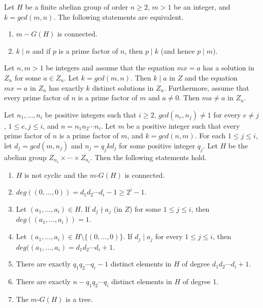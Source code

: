 \documentclass[10pt,a4paper]{amsart}
\begin{document}
\begin{thm}\label{T1}
	Let $H$ be a finite abelian group of order $n \geq 2$, $m > 1$ be an integer, and $k = gcd(m, n)$. The following statements are equivalent.
	\begin{enumerate}
		\item $m-G(H)$ is connected.
		\item $k\mid n$ and if $p$ is a prime factor of $n$, then $p \mid k$ (and hence $p \mid m$).
	\end{enumerate}
\end{thm}

\begin{lem}\label{L1}
	Let $n, m > 1$ be integers and assume that the equation $mx = a$ has a solution in $Z_n$ for some $a\in Z_n$. Let $k = gcd(m, n) $. Then $k \mid a$ in $Z$ and the equation $mx = a$ in $Z_n$ has exactly $k$ distinct solutions in $Z_n$.  Furthermore, assume that every prime factor of $n$ is a prime factor of $m$ and $a \not = 0$. Then $ma \not = a$ in $Z_n$.	
	\end{lem}

\begin{thm}\label{T5}
	Let $n_1, ..., n_i$  be positive integers such that $i \geq 2$,  $gcd(n_e, n_j) \not = 1$ for every $e \not = j$, $1 \leq e, j \leq i$, and $n = n_1n_2 \cdots n_i$. Let $m$ be a positive integer such that every prime factor of $n$ is a prime factor of $m$, and $k = gcd(n, m)$. For each $1 \leq j \leq i$, let $d_j = gcd(m, n_j)$ and $n_j = q_jkd_j$ for some positive integer $q_j$. Let $H$ be the abelian group $Z_{n_1}  \times \cdots \times Z_{n_i}$. Then the following statements hold.
	\begin{enumerate}
		\item  $H$ is not cyclic and the $m$-$G(H)$ is connected.
		\item $deg((0, ..., 0)) = d_1d_2\cdots d_i  - 1 \geq 2^i -1$.
		\item Let $(a_1, ..., a_i) \in H$. If $d_j \nmid a_j$ (in $Z$) for some $1 \leq j \leq i$, then $deg((a_1, ..., a_i)) = 1$.
		\item Let $(a_1, ..., a_i) \in H \setminus \{ (0, ..., 0)\}$. If $d_j \mid a_j$ for every $1 \leq j \leq i$, then $deg((a_1, ... , a_i) = d_1d_2 \cdots d_i + 1$.
		\item There are exactly $q_1q_2 \cdots q_i - 1$ distinct elements in $H$ of degree $d_1d_2 \cdots d_i + 1$.
		\item There are exactly $n - q_1q_2 \cdots q_i$ distinct elements in $H$ of degree 1.
		\item The $m$-$G(H)$ is a tree.
	\end{enumerate}
\end{thm}
\end{document}

